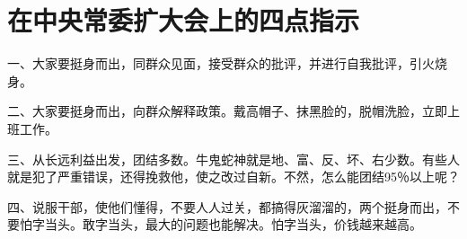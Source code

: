 \section[在中央常委扩大会上的四点指示（一九六六年十二月）]{在中央常委扩大会上的四点指示}


一、大家要挺身而出，同群众见面，接受群众的批评，并进行自我批评，引火烧身。

二、大家要挺身而出，向群众解释政策。戴高帽子、抹黑脸的，脱帽洗脸，立即上班工作。

三、从长远利益出发，团结多数。牛鬼蛇神就是地、富、反、坏、右少数。有些人就是犯了严重错误，还得挽救他，使之改过自新。不然，怎么能团结95％以上呢？

四、说服干部，使他们懂得，不要人人过关，都搞得灰溜溜的，两个挺身而出，不要怕字当头。敢字当头，最大的问题也能解决。怕字当头，价钱越来越高。


